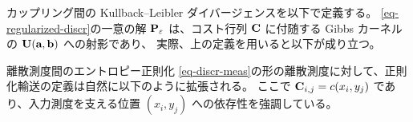 カップリング間の Kullback--Leibler ダイバージェンスを以下で定義する。
\eqref{eq-regularized-discr}の一意の解 $\P_\varepsilon$ は、コスト行列 $\C$ に付随する Gibbs カーネルの $\CouplingsD(\a,\b)$ への射影であり、
実際、上の定義を用いると以下が成り立つ。




\begin{rem1}{離散測度間のエントロピー正則化}\label{rem:entrop-reg}
\eqref{eq-discr-meas}の形の離散測度に対して、正則化輸送の定義は自然に以下のように拡張される。
\eql{\label{eq-entropic-disc-meas}
	\MK_\c^\varepsilon(\al,\be) \eqdef \MKD_\C^\varepsilon(\a,\b),
}
ここで $\C_{i,j}=\c(x_i,y_j)$ であり、入力測度を支える位置 $(x_i,y_j)$ への依存性を強調している。
\end{rem1}


